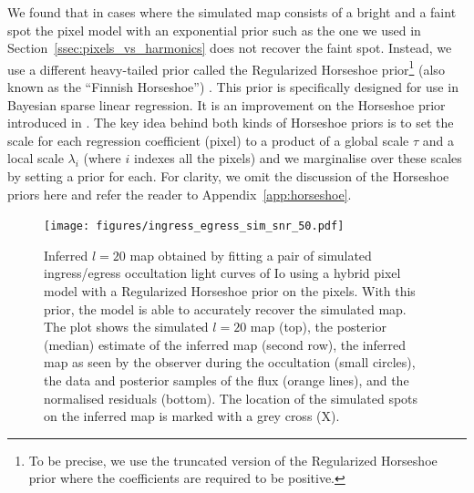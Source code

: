 \documentclass[12pt,dvipsnames]{report}
\begin{document}
We found that in cases where the simulated map consists of a bright and a faint spot the pixel model with an exponential prior such as the one we used in Section~\ref{ssec:pixels_vs_harmonics} does not recover the faint spot. 
Instead, we use a different heavy-tailed prior called the Regularized Horseshoe prior\footnote{To be precise, we use the truncated version of the Regularized Horseshoe prior where the coefficients are required to be positive.} 
(also known as the ``Finnish Horseshoe'') \citep{10.1214/17-EJS1337SI}.
This prior is specifically designed for use in Bayesian sparse linear regression. 
It is an improvement on the Horseshoe prior introduced in \citet{carvalho2010}.
The key idea behind both kinds of Horseshoe priors is to set the scale for each 
regression coefficient (pixel) to a product of a global scale $\tau$ and a local scale 
$\lambda_i$ (where $i$ indexes all the pixels) and we marginalise over these scales by 
setting a prior for each. For clarity, we omit the discussion of  the Horseshoe 
priors here and refer the reader to Appendix~\ref{app:horseshoe}.

\begin{figure}[t!]
    \begin{centering}
    \texttt{[image: figures/ingress\_egress\_sim\_snr\_50.pdf]}
    \caption{
        Inferred $l=20$ map obtained by fitting a pair of simulated ingress/egress occultation light curves of Io using a hybrid pixel model with a Regularized Horseshoe prior on the pixels.
With this prior, the model is able to accurately recover the simulated map.
        The plot shows the simulated $l=20$ map (top), the posterior (median) estimate of the inferred map (second row), the inferred map as seen by the observer during the occultation (small circles), the data and posterior samples of the flux (orange lines), and the normalised residuals (bottom).
        The location of the simulated spots on the inferred map is marked with a grey cross (X).
    }
       \label{fig:ingress_egress_sim_snr_50}
    \end{centering}
\end{figure}
\end{document}
